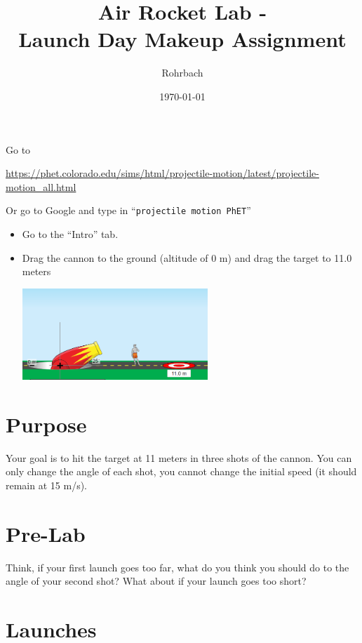 \documentclass[10pt]{exam}
\title{Air Rocket Lab - \\ \sc Launch Day Makeup Assignment}
\author{Rohrbach}
\date{\today}
\begin{document}
\maketitle


\noindent
Go to 

{\small \url{https://phet.colorado.edu/sims/html/projectile-motion/latest/projectile-motion_all.html}}

\noindent
Or go to Google and type in ``\texttt{projectile motion PhET}''

\begin{itemize}
  \item Go to the ``Intro'' tab.
  \item Drag the cannon to the ground (altitude of 0 m)	and drag the target to 11.0 meters
  
  \includegraphics[width=7cm]{cannon.png} 
\end{itemize}


\section*{Purpose}
 Your goal is to hit the target at 11 meters in three shots of the cannon.  You can only change the angle of each shot, you cannot change the initial speed (it should remain at 15 m/s).

\section*{Pre-Lab}

\begin{questions}


  \question
    Think, if your first launch goes too far, what do you think you should do to the angle of your second shot?  What about if your launch goes too short?
    \vspace{5em}

  
\end{questions}

\section*{Launches}
\end{document}
